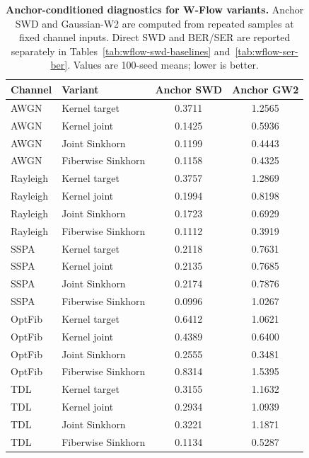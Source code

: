 \begin{table}[t]
\centering
\caption{\textbf{Anchor-conditioned diagnostics for W-Flow variants.} Anchor SWD and Gaussian-W2 are computed from repeated samples at fixed channel inputs. Direct SWD and BER/SER are reported separately in Tables~\ref{tab:wflow-swd-baselines} and~\ref{tab:wflow-ser-ber}. Values are 100-seed means; lower is better.}
\label{tab:wflow-conditional-metrics}
\tablefontsize
\begin{tabular}{@{}llcc@{}}
\toprule
Channel & Variant & Anchor SWD & Anchor GW2 \\
\midrule
AWGN & Kernel target & 0.3711 & 1.2565 \\
AWGN & Kernel joint & 0.1425 & 0.5936 \\
AWGN & Joint Sinkhorn & 0.1199 & 0.4443 \\
AWGN & Fiberwise Sinkhorn & 0.1158 & 0.4325 \\
\midrule
Rayleigh & Kernel target & 0.3757 & 1.2869 \\
Rayleigh & Kernel joint & 0.1994 & 0.8198 \\
Rayleigh & Joint Sinkhorn & 0.1723 & 0.6929 \\
Rayleigh & Fiberwise Sinkhorn & 0.1112 & 0.3919 \\
\midrule
SSPA & Kernel target & 0.2118 & 0.7631 \\
SSPA & Kernel joint & 0.2135 & 0.7685 \\
SSPA & Joint Sinkhorn & 0.2174 & 0.7876 \\
SSPA & Fiberwise Sinkhorn & 0.0996 & 1.0267 \\
\midrule
OptFib & Kernel target & 0.6412 & 1.0621 \\
OptFib & Kernel joint & 0.4389 & 0.6400 \\
OptFib & Joint Sinkhorn & 0.2555 & 0.3481 \\
OptFib & Fiberwise Sinkhorn & 0.8314 & 1.5395 \\
\midrule
TDL & Kernel target & 0.3155 & 1.1632 \\
TDL & Kernel joint & 0.2934 & 1.0939 \\
TDL & Joint Sinkhorn & 0.3221 & 1.1871 \\
TDL & Fiberwise Sinkhorn & 0.1134 & 0.5287 \\
\bottomrule
\end{tabular}
\end{table}
